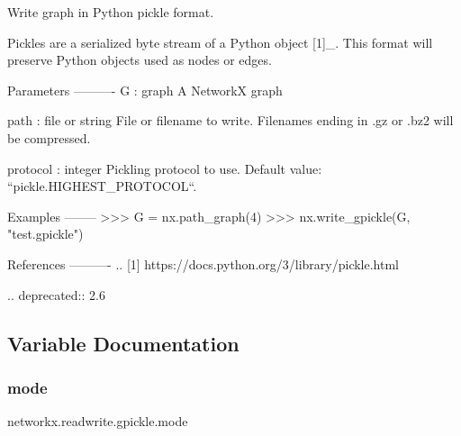 \begin{DoxyVerb}Write graph in Python pickle format.

Pickles are a serialized byte stream of a Python object [1]_.
This format will preserve Python objects used as nodes or edges.

Parameters
----------
G : graph
   A NetworkX graph

path : file or string
   File or filename to write.
   Filenames ending in .gz or .bz2 will be compressed.

protocol : integer
    Pickling protocol to use. Default value: ``pickle.HIGHEST_PROTOCOL``.

Examples
--------
>>> G = nx.path_graph(4)
>>> nx.write_gpickle(G, "test.gpickle")

References
----------
.. [1] https://docs.python.org/3/library/pickle.html

.. deprecated:: 2.6
\end{DoxyVerb}
 

\subsection{Variable Documentation}
\mbox{\label{namespacenetworkx_1_1readwrite_1_1gpickle_abd01337093697403592fcbf5de20d3e7}} 
\subsubsection{\texorpdfstring{mode}{mode}}
{\footnotesize\ttfamily networkx.\+readwrite.\+gpickle.\+mode}

